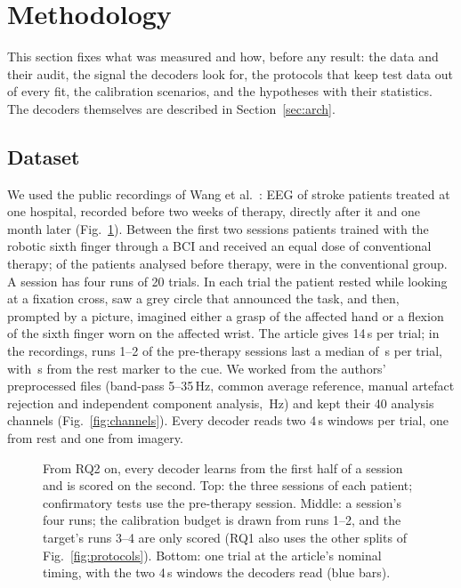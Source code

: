 \section{Methodology}
\label{sec:method}

This section fixes what was measured and how, before any result: the data and their audit, the
signal the decoders look for, the protocols that keep test data out of every fit, the
calibration scenarios, and the hypotheses with their statistics. The decoders themselves are
described in Section~\ref{sec:arch}.

\subsection{Dataset}
\label{sec:dataset}
We used the public recordings of Wang et al.~\cite{wang2026dataset,wang2026figshare}: EEG of
\nSubjects{} stroke patients treated at one hospital, recorded before two weeks of therapy,
directly after it and one month later (Fig.~\ref{fig:session}). Between the first two sessions
\nPostGroupB{} patients trained with the robotic sixth finger through a BCI and \nPostGroupT{}
received an equal dose of conventional therapy; of the \nPre{} patients analysed before therapy,
\nPreGroupT{} were in the conventional group. A session has four runs of 20 trials. In each trial
the patient rested while looking at a fixation cross, saw a grey circle that announced the task,
and then, prompted by a picture, imagined either a grasp of the affected hand or a flexion of the
sixth finger worn on the affected wrist. The article gives 14\,s per trial; in the recordings,
runs 1--2 of the pre-therapy sessions last a median of \rqTwoTrialSecondsRecorded\,s per trial,
with \rqTwoRestSecondsRecorded\,s from the rest marker to the cue. We worked from the authors'
preprocessed files (band-pass 5--35\,Hz, common average reference, manual artefact rejection and
independent component analysis, \nSamplingRate\,Hz) and kept their 40 analysis channels
(Fig.~\ref{fig:channels}). Every
decoder reads two 4\,s windows per trial, one from rest and one from imagery.

\begin{figure}[!t]
  \centering
  
  \caption{From RQ2 on, every decoder learns from the first half of a session and is scored on
  the second. Top: the three sessions of each patient; confirmatory tests use the pre-therapy
  session. Middle: a session's four runs; the calibration budget is drawn from runs 1--2, and the
  target's runs 3--4 are only scored (RQ1 also uses the other splits of Fig.~\ref{fig:protocols}). Bottom: one trial at the article's nominal timing, with the two 4\,s
  windows the decoders read (blue bars).}
  \label{fig:session}
\end{figure}

